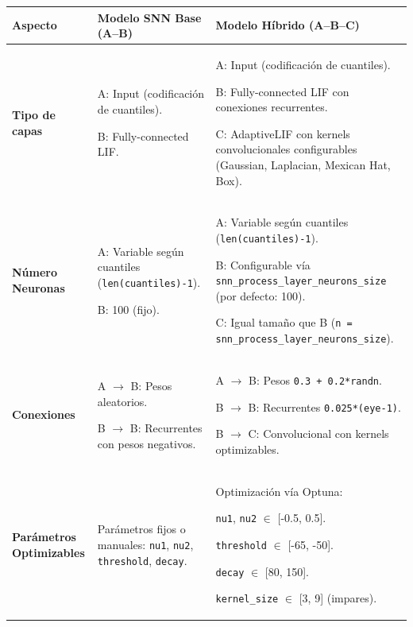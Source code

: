 \begin{table}[!htbp]
\centering
\small
\renewcommand{\arraystretch}{1.3}
\begin{tabularx}{0.99\textwidth}{>{\hsize=0.5\hsize\raggedright\arraybackslash}X
                                 >{\hsize=1.2\hsize\raggedright\arraybackslash}X
                                 >{\hsize=1.3\hsize\raggedright\arraybackslash}X}
\hline\hline
\textbf{Aspecto} & \textbf{Modelo SNN Base (A--B)} & \textbf{Modelo Híbrido (A--B--C)} \\
\hline
\textbf{Tipo de capas} & 
A: Input (codificación de cuantiles).  

B: Fully-connected LIF. & 

A: Input (codificación de cuantiles).  

B: Fully-connected LIF con conexiones recurrentes.  

C: AdaptiveLIF con kernels convolucionales configurables (Gaussian, Laplacian, Mexican Hat, Box). \\
\hline
\textbf{Número Neuronas} & 
A: Variable según cuantiles (\texttt{len(cuantiles)-1}).

B: 100 (fijo). & 

A: Variable según cuantiles (\texttt{len(cuantiles)-1}).  

B: Configurable vía \texttt{snn\_process\_layer\_neurons\_size} (por defecto: 100).  

C: Igual tamaño que B (\texttt{n = snn\_process\_layer\_neurons\_size}). \\
\hline
\textbf{Conexiones} & 
A $\rightarrow$ B: Pesos aleatorios.  

B $\rightarrow$ B: Recurrentes con pesos negativos. & 

A $\rightarrow$ B: Pesos \texttt{0.3 + 0.2*randn}.

B $\rightarrow$ B: Recurrentes \texttt{0.025*(eye-1)}.

B $\rightarrow$ C: Convolucional con kernels optimizables. \\
\hline
\textbf{Parámetros Optimizables} & 
Parámetros fijos o manuales:  
\texttt{nu1}, \texttt{nu2}, \texttt{threshold}, \texttt{decay}. & 
Optimización vía Optuna:  

\texttt{nu1}, \texttt{nu2} $\in$ [-0.5, 0.5].

\texttt{threshold} $\in$ [-65, -50].  

\texttt{decay} $\in$ [80, 150].  

\texttt{kernel\_size} $\in$ [3, 9] (impares).  


\end{tabularx}
\end{table}
